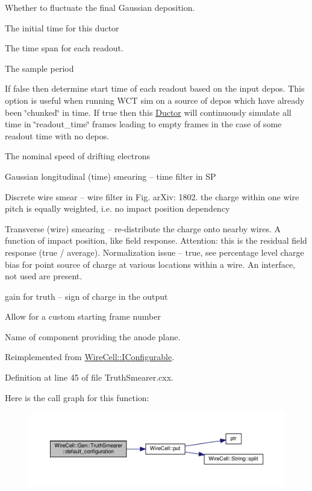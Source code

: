Whether to fluctuate the final Gaussian deposition.

The initial time for this ductor

The time span for each readout.

The sample period

If false then determine start time of each readout based on the input depos. This option is useful when running W\+CT sim on a source of depos which have already been \char`\"{}chunked\char`\"{} in time. If true then this \hyperlink{class_wire_cell_1_1_gen_1_1_ductor}{Ductor} will continuously simulate all time in \char`\"{}readout\+\_\+time\char`\"{} frames leading to empty frames in the case of some readout time with no depos.

The nominal speed of drifting electrons

Gaussian longitudinal (time) smearing -- time filter in SP

Discrete wire smear -- wire filter in Fig. ar\+Xiv\+: 1802. the charge within one wire pitch is equally weighted, i.\+e. no impact position dependency

Transverse (wire) smearing -- re-\/distribute the charge onto nearby wires. A function of impact position, like field response. Attention\+: this is the residual field response (true / average). Normalization issue -- true, see percentage level charge bias for point source of charge at various locations within a wire. An interface, not used are present.

gain for truth -- sign of charge in the output

Allow for a custom starting frame number

Name of component providing the anode plane. 

Reimplemented from \hyperlink{class_wire_cell_1_1_i_configurable_a54841b2da3d1ea02189478bff96f7998}{Wire\+Cell\+::\+I\+Configurable}.



Definition at line 45 of file Truth\+Smearer.\+cxx.

Here is the call graph for this function\+:
\nopagebreak
\begin{figure}[H]
\begin{center}
\leavevmode
\includegraphics[width=350pt]{class_wire_cell_1_1_gen_1_1_truth_smearer_a9ba841f3a493bb16e41d87e69448843c_cgraph}
\end{center}
\end{figure}
\mbox{\label{class_wire_cell_1_1_gen_1_1_truth_smearer_a67cb4fc4a60604fe8034b5837f3a27a0}} 
